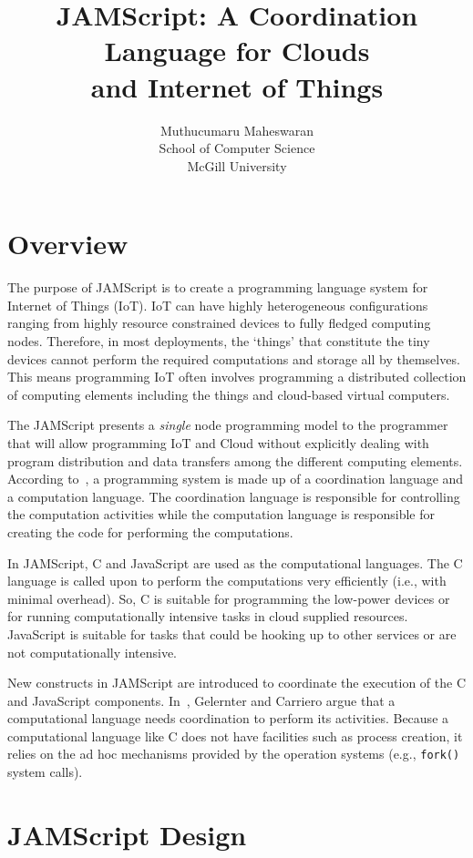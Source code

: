 \documentclass[11pt]{article}
\title{JAMScript: A Coordination Language for Clouds \\ and Internet of Things}
\author{Muthucumaru Maheswaran \\ School of Computer Science \\ McGill University}
\begin{document}
\maketitle

\section{Overview}

The purpose of JAMScript is to create a programming language system for Internet
of Things (IoT). IoT can have highly heterogeneous configurations ranging from
highly resource constrained devices to fully fledged computing nodes. Therefore,
in most deployments, the `things' that constitute the tiny devices cannot
perform the required computations and storage all by themselves. This means
programming IoT often involves programming a distributed collection of computing
elements including the things and cloud-based virtual computers.

The JAMScript presents a {\em single} node programming model to the programmer
that will allow programming IoT and Cloud without explicitly dealing with
program distribution and data transfers among the different computing elements.
According to~\cite{Gelernter:1992hz}, a programming system is made up of a
coordination language and a computation language. The coordination language is
responsible for controlling the computation activities while the computation
language is responsible for creating the code for performing the computations.

In JAMScript, C and JavaScript are used as the computational languages. The C
language is called upon to perform the computations very efficiently (i.e., with
minimal overhead). So, C is suitable for programming the low-power devices or
for running computationally intensive tasks in cloud supplied resources.
JavaScript is suitable for tasks that could be hooking up to other services or
are not computationally intensive.

New constructs in JAMScript are introduced to coordinate the execution of the C
and JavaScript components. In~\cite{Gelernter:1992hz}, Gelernter and Carriero
argue that a computational language needs coordination to perform its
activities. Because a computational language like C does not have facilities
such as process creation, it relies on the ad hoc mechanisms provided by the
operation systems (e.g., {\tt fork()} system calls).

\section{JAMScript Design}
\end{document}
